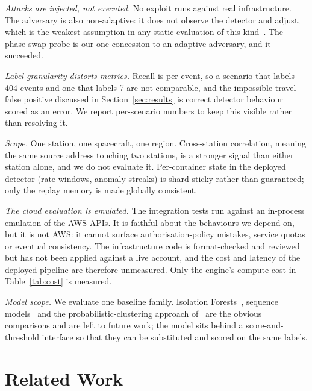 \documentclass[conference]{IEEEtran}
\begin{document}
\emph{Attacks are injected, not executed.} No exploit runs against real
infrastructure. The adversary is also non-adaptive: it does not observe the
detector and adjust, which is the weakest assumption in any static evaluation of
this kind~\cite{sommer2010closedworld}. The phase-swap probe is our one
concession to an adaptive adversary, and it succeeded.

\emph{Label granularity distorts metrics.} Recall is per event, so a scenario
that labels 404 events and one that labels 7 are not comparable, and the
impossible-travel false positive discussed in Section~\ref{sec:results} is
correct detector behaviour scored as an error. We report per-scenario numbers to
keep this visible rather than resolving it.

\emph{Scope.} One station, one spacecraft, one region. Cross-station
correlation, meaning the same source address touching two stations, is a
stronger signal than either station alone, and we do not evaluate it. Per-container state
in the deployed detector (rate windows, anomaly streaks) is shard-sticky rather
than guaranteed; only the replay memory is made globally consistent.

\emph{The cloud evaluation is emulated.} The integration tests run against an
in-process emulation of the AWS APIs. It is faithful about the behaviours we
depend on, but it is not AWS: it cannot surface authorisation-policy mistakes,
service quotas or eventual consistency. The infrastructure code is format-checked
and reviewed but has not been applied against a live account, and the cost and
latency of the deployed pipeline are therefore unmeasured. Only the engine's
compute cost in Table~\ref{tab:cost} is measured.

\emph{Model scope.} We evaluate one baseline family. Isolation
Forests~\cite{liu2008isolation}, sequence models~\cite{hundman2018lstm} and the
probabilistic-clustering approach of~\cite{yairi2017datadriven} are the obvious
comparisons and are left to future work; the model sits behind a
score-and-threshold interface so that they can be substituted and scored on the
same labels.

\section{Related Work}
\end{document}
